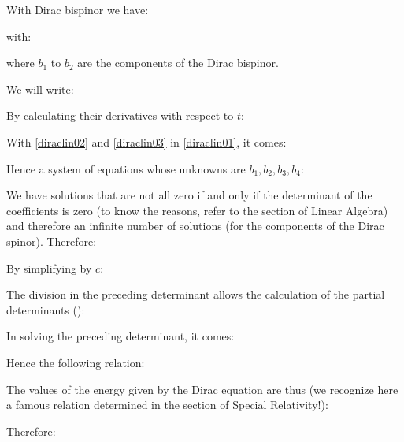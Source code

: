 	With Dirac bispinor we have:
	
	with:
	
	where $b_1$ to $b_2$ are the components of the Dirac bispinor.
	
	We will write:
	
	By calculating their derivatives with respect to $t$:
	
	With \eqref{diraclin02} and \eqref{diraclin03} in \eqref{diraclin01}, it comes:
	
	Hence a system of equations whose unknowns are $b_1,b_2,b_3,b_4$:
	
	We have solutions that are not all zero if and only if the determinant of the coefficients is zero (to know the reasons, refer to the section of Linear Algebra) and therefore an infinite number of solutions (for the components of the Dirac spinor). Therefore:
	
	By simplifying by $c$:
	
	The division in the preceding determinant allows the calculation of the partial determinants ():
	
	In solving the preceding determinant, it comes:
	
	Hence the following relation:
	
	The values of the energy given by the Dirac equation are thus (we recognize here a famous relation determined in the section of Special Relativity!):
	
	Therefore:
	
